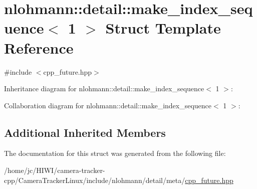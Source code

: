 \hypertarget{structnlohmann_1_1detail_1_1make__index__sequence_3_011_01_4}{}\section{nlohmann\+:\+:detail\+:\+:make\+\_\+index\+\_\+sequence$<$ 1 $>$ Struct Template Reference}
\label{structnlohmann_1_1detail_1_1make__index__sequence_3_011_01_4}


{\ttfamily \#include $<$cpp\+\_\+future.\+hpp$>$}



Inheritance diagram for nlohmann\+:\+:detail\+:\+:make\+\_\+index\+\_\+sequence$<$ 1 $>$\+:


Collaboration diagram for nlohmann\+:\+:detail\+:\+:make\+\_\+index\+\_\+sequence$<$ 1 $>$\+:
\subsection*{Additional Inherited Members}


The documentation for this struct was generated from the following file\+:\begin{DoxyCompactItemize}
\item 
/home/jc/\+H\+I\+W\+I/camera-\/tracker-\/cpp/\+Camera\+Tracker\+Linux/include/nlohmann/detail/meta/\hyperlink{cpp__future_8hpp}{cpp\+\_\+future.\+hpp}\end{DoxyCompactItemize}
